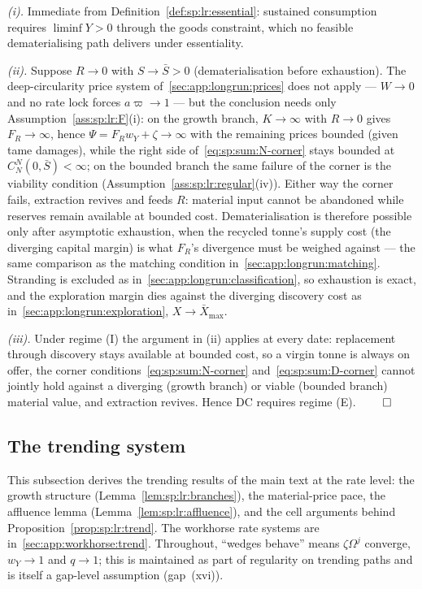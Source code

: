 \emph{(i).} Immediate from Definition~\ref{def:sp:lr:essential}: sustained consumption
requires $\liminf Y>0$ through the goods constraint, which no feasible dematerialising path
delivers under essentiality.

\emph{(ii).} Suppose $R\to0$ with $S\to\bar S>0$ (dematerialisation before exhaustion). The
deep-circularity price system of~\ref{sec:app:longrun:prices} does not apply --- $W\to0$ and no
rate lock forces $a\varpi\to1$ --- but the conclusion needs only
Assumption~\ref{ass:sp:lr:F}(i): on the growth branch, $K\to\infty$ with $R\to0$ gives
$F_R\to\infty$, hence $\Psi=F_Rw_Y+\zeta\to\infty$ with the remaining prices bounded (given
tame damages), while the right side of~\eqref{eq:sp:sum:N-corner} stays bounded at
$C^N_N\left(0,\bar S\right)<\infty$; on the bounded branch the same failure of the corner is
the viability condition (Assumption~\ref{ass:sp:lr:regular}(iv)). Either way the corner fails,
extraction revives and feeds $R$: material input cannot be abandoned while reserves remain
available at bounded cost. Dematerialisation is therefore possible only after asymptotic
exhaustion, when the recycled tonne's supply cost (the diverging capital margin) is what
$F_R$'s divergence must be weighed against --- the same comparison as the matching condition
in~\ref{sec:app:longrun:matching}. Stranding is excluded as
in~\ref{sec:app:longrun:classification}, so exhaustion is exact, and the exploration margin
dies against the diverging discovery cost as in~\ref{sec:app:longrun:exploration},
$X\to\bar X_{\max}$.

\emph{(iii).} Under regime (I) the argument in (ii) applies at every date: replacement through
discovery stays available at bounded cost, so a virgin tonne is always on offer, the corner
conditions~\eqref{eq:sp:sum:N-corner} and~\eqref{eq:sp:sum:D-corner} cannot jointly hold
against a diverging (growth branch) or viable (bounded branch) material value, and extraction
revives. Hence DC requires regime (E). \hfill$\qed$

\subsection{The trending system}\label{sec:app:longrun:trend}

This subsection derives the trending results of the main text at the rate level: the growth
structure (Lemma~\ref{lem:sp:lr:branches}), the material-price pace, the affluence lemma
(Lemma~\ref{lem:sp:lr:affluence}), and the cell arguments behind
Proposition~\ref{prop:sp:lr:trend}. The workhorse rate systems are
in~\ref{sec:app:workhorse:trend}. Throughout, ``wedges behave'' means $\zeta\Omega^j$
converge, $w_Y\to1$ and $q\to1$; this is maintained as part of regularity on trending paths
and is itself a gap-level assumption (gap~(xvi)).

